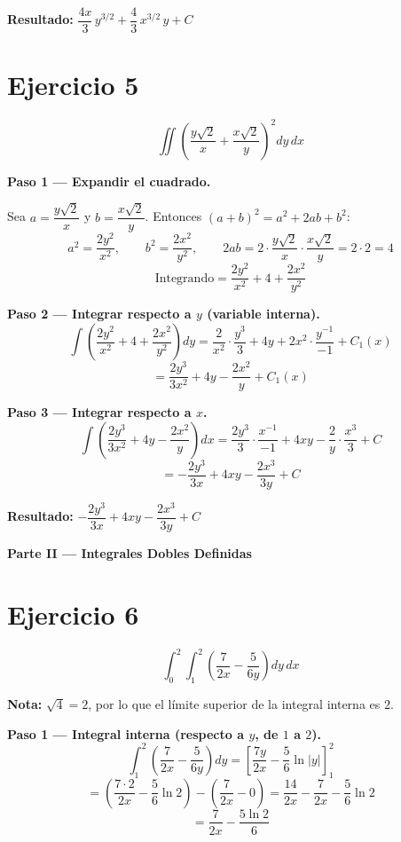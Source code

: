 \documentclass[12pt,a4paper]{article}
\newcommand{\resultado}[1]{%
  \textcolor{resultcolor}{\textbf{Resultado: } $\displaystyle #1$}%
}
\begin{document}
\medskip
\resultado{\dfrac{4x}{3}\,y^{3/2} + \dfrac{4}{3}\,x^{3/2}\,y + C}

\bigskip
\section*{Ejercicio 5}
\[
  \iint \left(\frac{y\sqrt{2}}{x} + \frac{x\sqrt{2}}{y}\right)^2 dy \, dx
\]

\textbf{Paso 1 — Expandir el cuadrado.}

Sea $a = \dfrac{y\sqrt{2}}{x}$ y $b = \dfrac{x\sqrt{2}}{y}$. Entonces $(a+b)^2 = a^2 + 2ab + b^2$:
\[
  a^2 = \frac{2y^2}{x^2}, \qquad
  b^2 = \frac{2x^2}{y^2}, \qquad
  2ab = 2\cdot\frac{y\sqrt{2}}{x}\cdot\frac{x\sqrt{2}}{y} = 2\cdot 2 = 4
\]
\[
  \text{Integrando} = \frac{2y^2}{x^2} + 4 + \frac{2x^2}{y^2}
\]

\textbf{Paso 2 — Integrar respecto a $y$ (variable interna).}
\[
  \int \left(\frac{2y^2}{x^2} + 4 + \frac{2x^2}{y^2}\right) dy
  = \frac{2}{x^2}\cdot\frac{y^3}{3} + 4y + 2x^2\cdot\frac{y^{-1}}{-1} + C_1(x)
\]
\[
  = \frac{2y^3}{3x^2} + 4y - \frac{2x^2}{y} + C_1(x)
\]

\textbf{Paso 3 — Integrar respecto a $x$.}
\[
  \int \left(\frac{2y^3}{3x^2} + 4y - \frac{2x^2}{y}\right) dx
  = \frac{2y^3}{3}\cdot\frac{x^{-1}}{-1} + 4xy - \frac{2}{y}\cdot\frac{x^3}{3} + C
\]
\[
  = -\frac{2y^3}{3x} + 4xy - \frac{2x^3}{3y} + C
\]

\medskip
\resultado{-\dfrac{2y^3}{3x} + 4xy - \dfrac{2x^3}{3y} + C}

\newpage
\begin{center}
\Large\bfseries Parte II — Integrales Dobles Definidas
\end{center}

\section*{Ejercicio 6}
\[
  \int_{0}^{2} \int_{1}^{2} \left(\frac{7}{2x} - \frac{5}{6y}\right) dy \, dx
\]

\textbf{Nota:} $\sqrt{4} = 2$, por lo que el límite superior de la integral interna es $2$.

\textbf{Paso 1 — Integral interna (respecto a $y$, de $1$ a $2$).}
\[
  \int_{1}^{2} \left(\frac{7}{2x} - \frac{5}{6y}\right) dy
  = \left[\frac{7y}{2x} - \frac{5}{6}\ln|y|\right]_{1}^{2}
\]
\[
  = \left(\frac{7\cdot 2}{2x} - \frac{5}{6}\ln 2\right) - \left(\frac{7}{2x} - 0\right)
  = \frac{14}{2x} - \frac{7}{2x} - \frac{5}{6}\ln 2
\]
\[
  = \frac{7}{2x} - \frac{5\ln 2}{6}
\]
\end{document}
